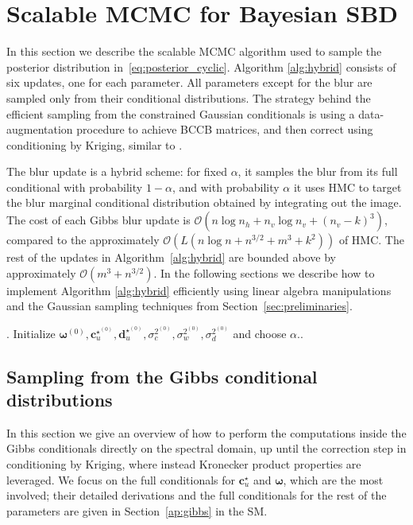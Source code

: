 \documentclass[12pt]{article}
\begin{document}
\section{Scalable MCMC for Bayesian SBD} \label{sec:mcmc}
In this section we describe the scalable MCMC algorithm used to sample the posterior distribution in~\eqref{eq:posterior_cyclic}.
Algorithm \ref{alg:hybrid} consists of six updates, one for each parameter. All parameters except for the blur are sampled only from their conditional distributions. 
The strategy behind the efficient sampling from the constrained Gaussian conditionals is using a data-augmentation procedure to achieve BCCB matrices, and then correct using conditioning by Kriging, similar to \citet{stroud2017bayesian}.

The blur update is a hybrid scheme: for fixed $\alpha$, it samples the blur from its full conditional with probability $1 - \alpha$, and with probability $\alpha$ it uses HMC to target the blur marginal conditional distribution obtained by integrating out the image. 
The cost of each Gibbs blur update is $\mathcal O\!\left(n \log n_h + n_v \log n_v + (n_v - k)^3\right)$, compared to the approximately
$\mathcal O\!\left(L (n\log n + n^{3/2} + m^3 + k^2)\right)$ of HMC. 
The rest of the updates in Algorithm~\ref{alg:hybrid} are bounded above by approximately $\mathcal{O}(m^3 + n^{3/2})$. 
In the following sections we describe how to implement Algorithm \ref{alg:hybrid} efficiently using linear algebra manipulations and the Gaussian sampling techniques from Section~\ref{sec:preliminaries}.

\begin{algorithm}
\caption{An MCMC algorithm for Bayesian semi-blind deconvolution}
\label{alg:hybrid}
. Initialize $\bm{\omega}^{(0)}, \bm{c}_u^{{\star}^{(0)}}, \bm{d}_u^{{\star}^{(0)}}, \sigma_c^{2^{(0)}}, \sigma_w^{2^{(0)}}, \sigma_d^{2^{(0)}}$ and choose $\alpha$.. 
\end{algorithm} 

\subsection{Sampling from the Gibbs conditional distributions}
In this section we give an overview of how to perform the computations inside the Gibbs conditionals directly on the spectral domain, up until the correction step in conditioning by Kriging, where instead Kronecker product properties are leveraged.
We focus on the full conditionals for $\bm{c}^{\star}_u$ and $\bm{\omega}$, which are the most involved; their detailed derivations and the full conditionals for the rest of the parameters are given in Section~\ref{ap:gibbs} in the SM. 
\end{document}
